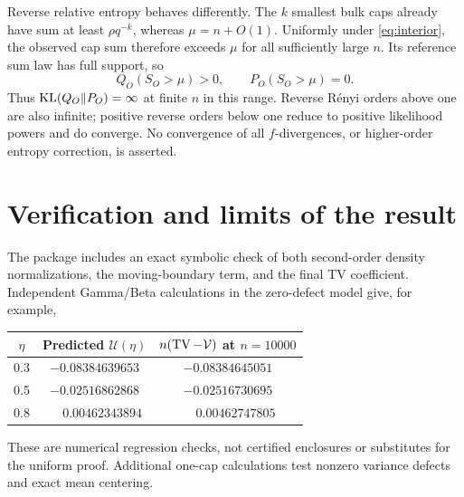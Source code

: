 \documentclass[11pt,a4paper]{article}
\theoremstyle{remark}\newtheorem*{ednote}{Editorial note (ProveIt, 2026-10-01)}
\begin{document}
Reverse relative entropy behaves differently. The $k$ smallest bulk caps already have sum at least $\rho q^{-k}$, whereas $\mu=n+O(1)$. Uniformly under \eqref{eq:interior}, the observed cap sum therefore exceeds $\mu$ for all sufficiently large $n$. Its reference sum law has full support, so
\[
 Q_O(S_O>\mu)>0,\qquad P_O(S_O>\mu)=0.
\]
Thus $\operatorname{KL}(Q_O\Vert P_O)=\infty$ at finite $n$ in this range. Reverse R\'enyi orders above one are also infinite; positive reverse orders below one reduce to positive likelihood powers and do converge. No convergence of all $f$-divergences, or higher-order entropy correction, is asserted.

\section{Verification and limits of the result}
The package includes an exact symbolic check of both second-order density normalizations, the moving-boundary term, and the final TV coefficient. Independent Gamma/Beta calculations in the zero-defect model give, for example,
\begin{center}
\begin{tabular}{ccc}\toprule
$\eta$ & Predicted $\mathcal U(\eta)$ & $n(\operatorname{TV}-\mathcal V)$ at $n=10000$\\\midrule
0.3 & $-0.08384639653$ & $-0.08384645051$\\
0.5 & $-0.02516862868$ & $-0.02516730695$\\
0.8 & $\phantom{-}0.00462343894$ & $\phantom{-}0.00462747805$\\\bottomrule
\end{tabular}
\end{center}
These are numerical regression checks, not certified enclosures or substitutes for the uniform proof. Additional one-cap calculations test nonzero variance defects and exact mean centering.
\end{document}
